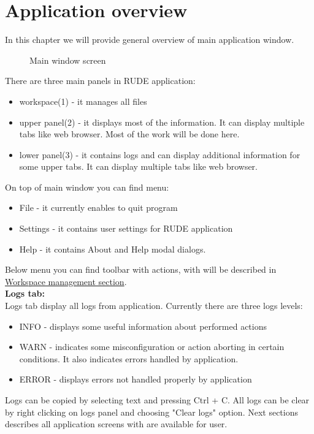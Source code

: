 \section{Application overview}\label{section:overview}

In this chapter we will provide general overview of main application window.

\begin{figure*}[!ht] 
	\centering
	\caption{Main window screen}
\end{figure*}

There are three main panels in RUDE application:
\begin{itemize}
	\item workspace(1) - it manages all files
	\item upper panel(2) - it displays most of the information. It can display multiple tabs like web browser. Most of the work will be done here.
	\item lower panel(3) - it contains logs and can display additional information for some upper tabs. It can display multiple tabs like web browser.
\end{itemize}

On top of main window you can find menu:
\begin{itemize}
	\item File - it currently enables to quit program
	\item Settings - it contains user settings for RUDE application
	\item Help - it contains About and Help modal dialogs.
\end{itemize}

Below menu you can find toolbar with actions, with will be described in \hyperref[section:workspace]{Workspace management section}.\\


\textbf{Logs tab:}\\
Logs tab display all logs from application. 
Currently there are three logs levels:
\begin{itemize}
	\item INFO - displays some useful information about performed actions
	\item WARN - indicates some misconfiguration or action aborting in certain conditions. It also indicates errors handled by application.
	\item ERROR - displays errors not handled properly by application
\end{itemize}

Logs can be copied by selecting text and pressing Ctrl + C. All logs can be clear by right clicking on logs panel and choosing "Clear logs" option.
\newline\newline
Next sections describes all application screens with are available for user.

\vfill\newpage